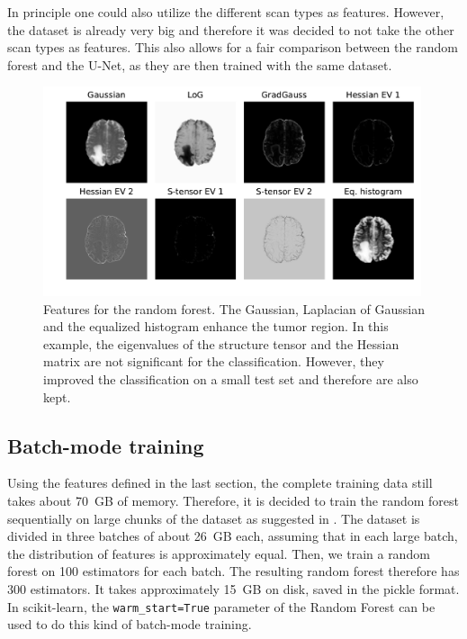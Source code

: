 \documentclass[final]{article}
\begin{document}
In principle one could also utilize the different scan types as features.
However, the dataset is already very big and therefore it was decided to not
take the other scan types as features. This also allows for a fair comparison
between the random forest and the U-Net, as they are then trained with the same
dataset.\\

\begin{figure}
\centering
\includegraphics[width=0.99\textwidth]{features}
\caption{Features for the random forest. The Gaussian, Laplacian of Gaussian
and the equalized histogram enhance the tumor region. In this example, the
eigenvalues of the structure tensor and the Hessian matrix are not significant
for the classification. However, they improved the classification on a small
test set and therefore are also kept.}
\label{fig:features}
\end{figure}

\subsection{Batch-mode training}
Using the features defined in the last section, the complete training data
still takes about \SI{70}{GB} of memory. Therefore, it is decided to train the
random forest sequentially on large chunks of the dataset as suggested in
\cite{batchrf}. The dataset is divided in three batches of about \SI{26}{GB}
each, assuming that in each large batch, the distribution of features is
approximately equal. Then, we train a random forest on 100 estimators for each
batch. The resulting random forest therefore has 300 estimators. It takes
approximately \SI{15}{GB} on disk, saved in the pickle format. In scikit-learn,
the \verb+warm_start=True+ parameter of the Random Forest can be used to do
this kind of batch-mode training.
\end{document}

